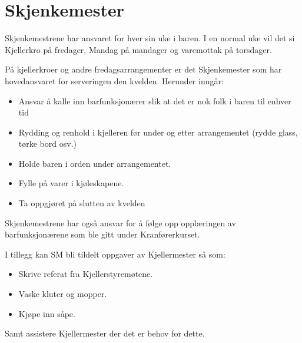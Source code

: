 \section{Skjenkemester}
Skjenkemestrene har ansvaret for hver sin uke i baren. I en normal uke vil det si Kjellerkro på fredager, Mandag på mandager og varemottak på torsdager.

På kjellerkroer og andre fredagsarrangementer er det Skjenkemester som har hovedansvaret for serveringen den kvelden. Herunder inngår: 

\begin{itemize}
\item Ansvar å kalle inn barfunksjonærer slik at det er nok folk i baren til enhver tid
\item Rydding og renhold i kjelleren før under og etter arrangementet (rydde glass, tørke bord osv.)
\item Holde baren i orden under arrangementet.
\item Fylle på varer i kjøleskapene.
\item Ta oppgjøret på slutten av kvelden
\end{itemize}

Skjenkemestrene har også ansvar for å følge opp
opplæringen av barfunksjonærene som ble gitt under Kranførerkurset.

I tillegg kan SM bli tildelt oppgaver av Kjellermester så som:
\begin{itemize}
\item Skrive referat fra Kjellerstyremøtene.
\item Vaske kluter og mopper.
\item Kjøpe inn såpe.
\end{itemize}

Samt assistere Kjellermester der det er behov for dette.
